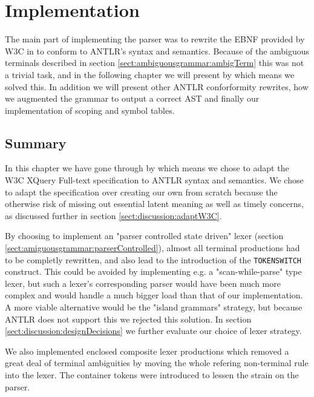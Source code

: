 \chapter{Implementation}
\label{chapter:implementation}

The main part of implementing the parser was to rewrite the EBNF provided by W3C in \cite{w3c01} to conform to ANTLR's syntax and semantics. Because of the ambiguous terminals described in section \ref{sect:ambiguousgrammar:ambigTerm} this was not a trivial task, and in the following chapter we will present by which means we solved this. In addition we will present other ANTLR conforformity rewrites, how we augmented the grammar to output a correct AST and finally our implementation of scoping and symbol tables.











\section{Summary}
In this chapter we have gone through by which means we chose to adapt the W3C
XQuery Full-text specification to ANTLR syntax and semantics. We chose to adapt
the specification over creating our own from scratch because the otherwise risk
of missing out essential latent meaning as well as timely concerns, as
discussed further in section \ref{sect:discussion:adaptW3C}.    

By choosing to implement an "parser controlled state driven" lexer (section
\ref{sect:amiguousgrammar:parserControlled}), almost all terminal productions
had to be completly rewritten, and also lead to the introduction of the
\verb!TOKENSWITCH! construct. This could be avoided by implementing e.g. a
"scan-while-parse" type lexer, but such a lexer's corresponding parser would
have been much more complex and would handle a much bigger load than that of
our implementation. A more viable alternative would be the "island grammars"
strategy, but because ANTLR does not support this we rejected this solution. In
section \ref{sect:discussion:designDecisions} we further evaluate our choice of
lexer strategy.         

We also implemented enclosed composite lexer productions which removed a great
deal of terminal ambiguities by moving the whole refering non-terminal rule
into the lexer. The container tokens were introduced to lessen the strain on
the parser.   

